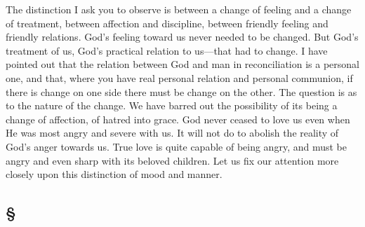 \documentclass[draft]{ptfdoc}
\begin{document}
The distinction I ask you to observe is 
between a change of feeling and a change of 
treatment, between affection and discipline, 
between friendly feeling and friendly relations. 
God's feeling toward us never needed to be 
changed. But God's treatment of us, God's 
practical relation to us---that had to change. I 
have pointed out that the relation between God 
and man in reconciliation is a personal one, and 
that, where you have real personal relation 
and personal communion, if there is change on 
one side there must be change on the other. 
The question is as to the nature of the change. 
We have barred out the possibility of its being a 
change of affection, of hatred into grace. God 
never ceased to love us even when He was most 
angry and severe with us. It will not do to 
abolish the reality of God's anger towards 
us. True love is quite capable of being angry, 
and must be angry and even sharp with its 
beloved children. Let us fix our attention 
more closely upon this distinction of mood and 
manner. 

\subsection*{
\S
}
\end{document}
